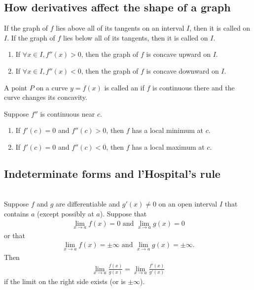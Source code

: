 \documentclass{article}
\begin{document}
\subsection{How derivatives affect the shape of a graph}
\begin{definition}
    If the graph of $f$ lies above all of its tangents on an interval $I$, then it is called  on $I$. If the graph of $f$ lies below all of its tangents, then it is called  on $I$.
\end{definition}
\begin{theorem}
    \begin{enumerate}
        \item If $\forall x\in I, f''(x)>0$, then the graph of $f$ is concave upward on $I$.
        \item If $\forall x\in I, f''(x)<0$, then the graph of $f$ is concave downward on $I$.
    \end{enumerate}
\end{theorem}
\begin{definition}
    A point $P$ on a curve $y=f(x)$ is called an  if $f$ is continuous there and the curve changes its concavity.
\end{definition}
\begin{theorem}
    Suppose $f''$ is continuous near $c$.
    \begin{enumerate}
        \item If $f'(c)=0$ and $f''(c)>0$, then $f$ has a local minimum at $c$.
        \item If $f'(c)=0$ and $f''(c)<0$, then $f$ has a local maximum at $c$.
    \end{enumerate}
\end{theorem}
\subsection{Indeterminate forms and l'Hospital's rule}
\begin{theorem}
    \\
    Suppose $f$ and $g$ are differentiable and $g'(x)\not=0$ on an open interval $I$ that contains $a$ (except possibly at $a$). Suppose that
    \begin{align*}
        \lim_{x\to a}f(x)=0\text{ and } \lim_{x\to a}g(x)=0
    \end{align*}
    or that
    \begin{align*}
        \lim_{x\to a}f(x)=\pm\infty \text{ and } \lim_{x\to a}g(x) = \pm\infty.
    \end{align*}
    Then
    \begin{align*}
        \lim_{x\to a}\frac{f(x)}{g(x)}=\lim_{x\to a}\frac{f'(x)}{g'(x)}
    \end{align*}
    if the limit on the right side exists (or is $\pm\infty$).
\end{theorem}
\setcounter{subsection}{6}
\end{document}

